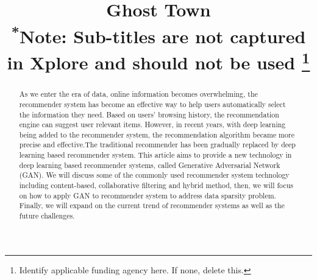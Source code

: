\documentclass[conference]{IEEEtran}
\begin{document}
\title{Ghost Town\\
{\footnotesize \textsuperscript{*}Note: Sub-titles are not captured in Xplore and
should not be used}
\thanks{Identify applicable funding agency here. If none, delete this.}
}

\author{
\and
{}
\and
{}
}

\maketitle
\thispagestyle{plain}
\pagestyle{plain}

\begin{abstract}
As we enter the era of data, online information becomes overwhelming, the recommender system has become an effective way to help users automatically select the information they need. Based on users’ browsing history, the recommendation engine can suggest user relevant items. However, in recent years, with deep learning being added to the recommender system, the recommendation algorithm became more precise and effective.The traditional recommender has been gradually replaced by deep learning based recommender system.
This article aims to provide a new technology in deep learning based recommender systems, called Generative Adversarial Network (GAN). We will discuss some of the commonly used recommender system technology including content-based, collaborative filtering and hybrid method, then, we will focus on how to apply GAN to recommender system to address data sparsity problem. Finally, we will expand on the current trend of recommender systems as well as the future challenges.
\end{abstract}
\end{document}
